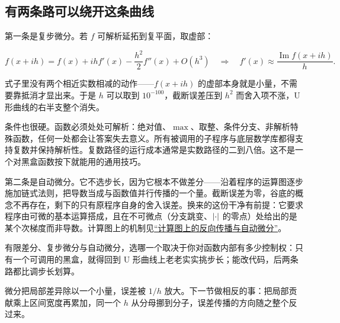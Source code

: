 \subsection{有两条路可以绕开这条曲线}

第一条是复步微分。若 \(f\) 可解析延拓到复平面，取虚部：

\[
f(x+ih)=f(x)+ihf'(x)-\frac{h^2}{2}f''(x)+O(h^3)
\quad\Longrightarrow\quad
f'(x)\approx\frac{\operatorname{Im}f(x+ih)}{h}.
\]

式子里没有两个相近实数相减的动作——\(f(x+ih)\) 的虚部本身就是小量，不需要靠抵消才显出来。于是 \(h\) 可以取到 \(10^{-100}\)，截断误差压到 \(h^2\) 而舍入项不涨，U 形曲线的右半支整个消失。

条件也很硬。函数必须处处可解析：绝对值、\(\max\)、取整、条件分支、非解析特殊函数，任何一处都会让答案失去意义。所有被调用的子程序与底层数学库都得支持复数并保持解析性。复数路径的运行成本通常是实数路径的二到八倍。这不是一个对黑盒函数按下就能用的通用技巧。

第二条是自动微分。它不选步长，因为它根本不做差分——沿着程序的运算图逐步施加链式法则，把导数当成与函数值并行传播的一个量。截断误差为零，谷底的概念不再存在，剩下的只有原程序自身的舍入误差。换来的这份干净有前提：它要求程序由可微的基本运算搭成，且在不可微点（分支跳变、\(\left|\cdot\right|\) 的零点）处给出的是某个次梯度而非导数。计算图上的机制见\hyperref[sec:10-Matrix-Calculus/04-Applications/03]{``计算图上的反向传播与自动微分''}。

有限差分、复步微分与自动微分，选哪一个取决于你对函数内部有多少控制权：只有一个可调用的黑盒，就得回到 U 形曲线上老老实实挑步长；能改代码，后两条路都比调步长划算。

微分把局部差异除以一个小量，误差被 \(1/h\) 放大。下一节做相反的事：把局部贡献乘上区间宽度再累加，同一个 \(h\) 从分母挪到分子，误差传播的方向随之整个反过来。
